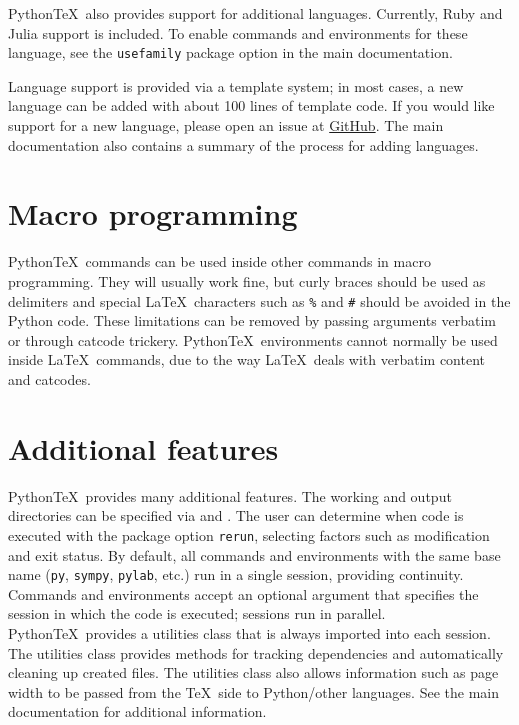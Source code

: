 \documentclass[twocolumn]{article}
\newcommand{\pytex}{Python\TeX}
\begin{document}
{\pytex\ also provides support for additional languages.  Currently, Ruby and Julia support is included.  To enable commands and environments for these language, see the \texttt{usefamily} package option in the main documentation.

Language support is provided via a template system; in most cases, a new language can be added with about 100 lines of template code.  If you would like support for a new language, please open an issue at \href{https://github.com/gpoore/pythontex}{GitHub}.  The main documentation also contains a summary of the process for adding languages.

\section*{Macro programming}

\pytex\ commands can be used inside other commands in macro programming.  They will usually work fine, but curly braces should be used as delimiters and special \LaTeX\ characters such as \texttt{\%} and \texttt{\#} should be avoided in the Python code.  These limitations can be removed by passing arguments verbatim or through catcode trickery.  \pytex\ environments cannot normally be used inside \LaTeX\ commands, due to the way \LaTeX\ deals with verbatim content and catcodes.


\section*{Additional features}

\pytex\ provides many additional features.  The working and output directories can be specified via  and .  The user can determine when code is executed with the package option \texttt{rerun}, selecting factors such as modification and exit status.  By default, all commands and environments with the same base name (\texttt{py}, \texttt{sympy}, \texttt{pylab}, etc.) run in a single session, providing continuity.  Commands and environments accept an optional argument that specifies the session in which the code is executed; sessions run in parallel.  \pytex\ provides a utilities class that is always imported into each session.  The utilities class provides methods for tracking dependencies and automatically cleaning up created files.  The utilities class also allows information such as page width to be passed from the \TeX\ side to Python/other languages.  See the main documentation for additional information.

}
\end{document}
